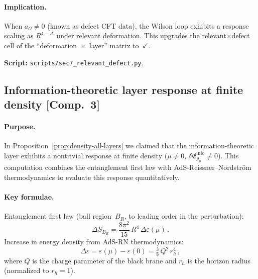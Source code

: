 \documentclass[
  aps,
  prd,
  preprint,
  groupedaddress,
  nofootinbib,
  longbibliography
]{revtex4-2}
\theoremstyle{remark}
\begin{document}
\paragraph{Implication.}
When $a_{\mathcal{O}}\neq 0$ (known as defect CFT data), the
Wilson loop exhibits a response scaling as $R^{4-\Delta}$ under
relevant deformation.
This upgrades the relevant$\times$defect cell of the
``deformation~$\times$~layer'' matrix to~$\checkmark$.

\noindent\textbf{Script:}
\texttt{scripts/sec7\_relevant\_defect.py}.

\subsection{Information-theoretic layer response at finite density
  [Comp.~3]}\label{app:A3}

\paragraph{Purpose.}
In Proposition~\ref{prop:density-all-layers} we claimed that the
information-theoretic layer exhibits a nontrivial response at
finite density ($\mu\neq 0$,
$\delta\mathfrak{E}_{\rho_0}^{\mathrm{info}}\neq 0$).
This computation combines the entanglement first law with
AdS-Reissner--Nordstr\"om thermodynamics to evaluate this response
quantitatively.

\paragraph{Key formulae.}
Entanglement first law (ball region~$B_R$, to leading order in the perturbation):
\begin{equation}\label{eq:EFL-app}
  \Delta S_{B_R}
  = \frac{8\pi^2}{15}\,R^4\,\Delta\varepsilon(\mu)\,.
\end{equation}
Increase in energy density from AdS-RN thermodynamics:
\begin{equation}\label{eq:Delta-eps}
  \Delta\varepsilon
  = \varepsilon(\mu)-\varepsilon(0)
  = \tfrac{3}{8}\,Q^2\,r_h^4\,,
\end{equation}
where $Q$ is the charge parameter of the black brane and $r_h$
is the horizon radius (normalized to $r_h=1$).
\end{document}
